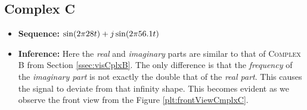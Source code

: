 \documentclass[../../course]{subfiles}
\begin{document}
\subsection{Complex C} \label{ssec:visCplxC}

\begin{itemize} [label=]

    \item \textbf{Sequence:} $\sin(2 \pi 28 t) + j \sin(2 \pi 56.1 t)$

    \item \textbf{Inference:} Here the \emph{real} and \emph{imaginary} parts are similar
        to that of \textsc{Complex B} from Section \ref{ssec:visCplxB}. The only difference
        is that the \emph{frequency} of the \emph{imaginary part} is not exactly the double
        that of the \emph{real part}. This causes the signal to deviate from that infinity shape.
        This becomes evident as we observe the front view from the Figure \ref{plt:frontViewCmplxC}.

\end{itemize}

\vfill
\end{document}
